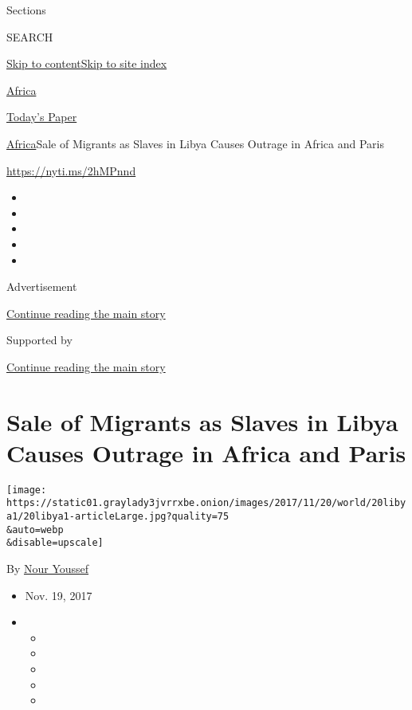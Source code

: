Sections

SEARCH

\protect\hyperlink{site-content}{Skip to
content}\protect\hyperlink{site-index}{Skip to site index}

\href{https://www.nytimes3xbfgragh.onion/section/world/africa}{Africa}

\href{https://myaccount.nytimes3xbfgragh.onion/auth/login?response_type=cookie\&client_id=vi}{}

\href{https://www.nytimes3xbfgragh.onion/section/todayspaper}{Today's
Paper}

\href{/section/world/africa}{Africa}\textbar{}Sale of Migrants as Slaves
in Libya Causes Outrage in Africa and Paris

\url{https://nyti.ms/2hMPnnd}

\begin{itemize}
\item
\item
\item
\item
\item
\end{itemize}

Advertisement

\protect\hyperlink{after-top}{Continue reading the main story}

Supported by

\protect\hyperlink{after-sponsor}{Continue reading the main story}

\hypertarget{sale-of-migrants-as-slaves-in-libya-causes-outrage-in-africa-and-paris}{%
\section{Sale of Migrants as Slaves in Libya Causes Outrage in Africa
and
Paris}\label{sale-of-migrants-as-slaves-in-libya-causes-outrage-in-africa-and-paris}}

\texttt{[image: https://static01.graylady3jvrrxbe.onion/images/2017/11/20/world/20libya1/20libya1-articleLarge.jpg?quality=75\\\&auto=webp\\\&disable=upscale]}

By \href{https://www.nytimes3xbfgragh.onion/by/nour-youssef}{Nour
Youssef}

\begin{itemize}
\item
  Nov. 19, 2017
\item
  \begin{itemize}
  \item
  \item
  \item
  \item
  \item
  \end{itemize}
\end{itemize}

